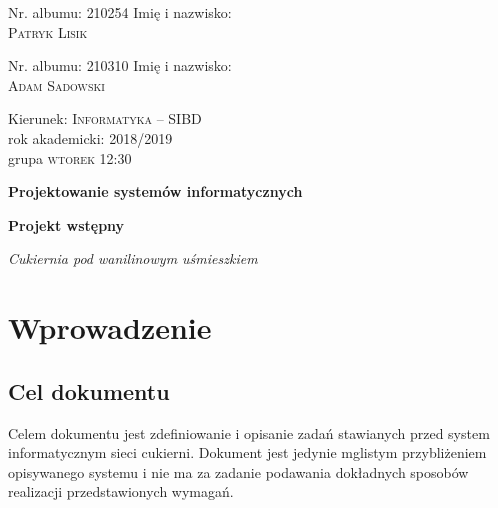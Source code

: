 \documentclass{article}
\begin{document}
\begin{titlepage}

\begin{minipage}{0.33 \textwidth}
\begin{flushleft}
\large
Nr. albumu: \textsc{210254}\linebreak
Imię i nazwisko:\\
\textsc{Patryk Lisik}
\end{flushleft}
\end{minipage}
\hspace{0.2\textwidth}
\begin{minipage}{0.33 \textwidth}
\begin{flushleft}
\large
Nr. albumu: \textsc{210310}\linebreak
Imię i nazwisko:\\
\textsc{Adam Sadowski}
\end{flushleft}
\end{minipage}

\vspace{3cm}

\begin{minipage}{0.9\textwidth}
\begin{flushleft}
\Large
Kierunek: \textsc{Informatyka -- SIBD} \\
rok akademicki: \textsc{2018/2019} \\
grupa \textsc{wtorek 12:30} \linebreak\linebreak
\end{flushleft}
\end{minipage}

\vspace{3cm}

{\center\huge\bfseries Projektowanie systemów informatycznych \par}
\vspace{1.5cm}
{\center\huge\bfseries Projekt wstępny \par}
{\center\Large\itshape Cukiernia pod wanilinowym uśmieszkiem \par}

\end{titlepage}
\section{Wprowadzenie}
\subsection{Cel dokumentu}
Celem dokumentu jest zdefiniowanie i opisanie zadań stawianych przed system informatycznym sieci cukierni. Dokument jest jedynie mglistym przybliżeniem opisywanego systemu i nie ma za zadanie podawania dokładnych sposobów realizacji przedstawionych wymagań.
\end{document}
